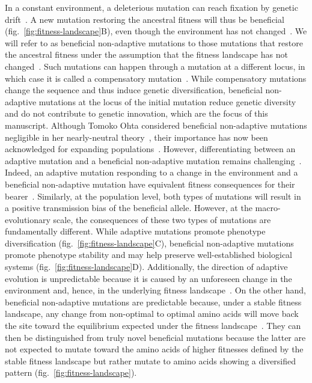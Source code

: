 \documentclass{article}
\begin{document}
    In a constant environment, a deleterious mutation can reach fixation by genetic drift~\cite{ohta_nearly_1992}.
    A new mutation restoring the ancestral fitness will thus be beneficial (fig.~\ref{fig:fitness-landscape}B), even though the environment has not changed~\cite{gillespie_ohta_1995, hartl_compensatory_1996, sella_application_2005, mustonen_fitness_2009, cvijovic_fate_2015}.
    We will refer to as beneficial non-adaptive mutations to those mutations that restore the ancestral fitness under the assumption that the fitness landscape has not changed~\cite{piganeau_estimating_2003, charlesworth_other_2007}.
    Such mutations can happen through a mutation at a different locus, in which case it is called a compensatory mutation~\cite{hartl_compensatory_1996, mustonen_fitness_2009}.
    While compensatory mutations change the sequence and thus induce genetic diversification, beneficial non-adaptive mutations at the locus of the initial mutation reduce genetic diversity and do not contribute to genetic innovation, which are the focus of this manuscript.
    Although Tomoko Ohta considered beneficial non-adaptive mutations negligible in her nearly-neutral theory~\cite{ohta_nearly_1992}, their importance has now been acknowledged for expanding populations~\cite{charlesworth_other_2007}.
    However, differentiating between an adaptive mutation and a beneficial non-adaptive mutation remains challenging~\cite{chi_detecting_2020}.
    Indeed, an adaptive mutation responding to a change in the environment and a beneficial non-adaptive mutation have equivalent fitness consequences for their bearer~\cite{charlesworth_other_2007}.
    Similarly, at the population level, both types of mutations will result in a positive transmission bias of the beneficial allele.
    However, at the macro-evolutionary scale, the consequences of these two types of mutations are fundamentally different.
    While adaptive mutations promote phenotype diversification (fig.~\ref{fig:fitness-landscape}C), beneficial non-adaptive mutations promote phenotype stability and may help preserve well-established biological systems (fig.~\ref{fig:fitness-landscape}D).
    Additionally, the direction of adaptive evolution is unpredictable because it is caused by an unforeseen change in the environment and, hence, in the underlying fitness landscape~\cite{bazykin_changing_2015}.
    On the other hand, beneficial non-adaptive mutations are predictable because, under a stable fitness landscape, any change from non-optimal to optimal amino acids will move back the site toward the equilibrium expected under the fitness landscape~\cite{moses_inferring_2009, fischer_germline_2011, chen_hunting_2021}.
    They can then be distinguished from truly novel beneficial mutations because the latter are not expected to mutate toward the amino acids of higher fitnesses defined by the stable fitness landscape but rather mutate to amino acids showing a diversified pattern (fig.~\ref{fig:fitness-landscape}).
\end{document}

